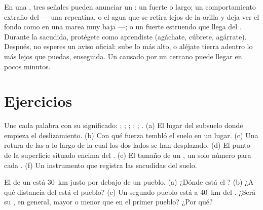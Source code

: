 \begin{remark}\label{rem:g7:earthquakes:natural-warning}
En una , tres señales pueden anunciar un : un  fuerte
o largo; un comportamiento extraño del  --- una  repentina, o
el agua que se retira lejos de la orilla y deja ver el fondo como en una
marea muy baja ---; o un fuerte estruendo que llega del . Durante la
sacudida, protégete como aprendiste (agáchate, cúbrete, agárrate). Después,
no esperes un aviso oficial: sube lo más alto, o aléjate tierra adentro lo
más lejos que puedas, enseguida. Un  causado por un 
cercano puede llegar en pocos minutos.
\end{remark}


\section{Ejercicios}

\begin{exercise}[$\star$]\label{exo:g7:earthquakes:1}
Une cada palabra con su significado: ; ; ;
; ; . (a) El lugar del subsuelo donde empieza
el deslizamiento. (b) Con qué fuerza tembló el suelo en un lugar. (c) Una
rotura de las  a lo largo de la cual los dos lados se han desplazado.
(d) El punto de la superficie situado encima del . (e) El tamaño
de un , un solo número para cada . (f) Un instrumento que
registra las sacudidas del suelo.
\end{exercise}

\begin{exercise}[$\star$]\label{exo:g7:earthquakes:2}
El  de un  está \qty{30}{km} justo por debajo de un
pueblo. (a) ¿Dónde está el ? (b) ¿A qué distancia del 
está el pueblo? (c) Un segundo pueblo está a \qty{40}{km} del .
¿Será su , en general, mayor o menor que en el primer pueblo?
¿Por qué?
\end{exercise}

